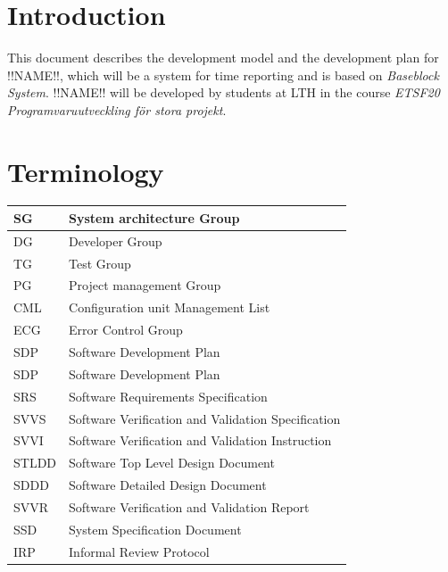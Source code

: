 \documentclass{article}
\date {#1}
\title {
    \documentNumber {01}    %
    \documentVersion {0.1}
    \documentTitle {Software Development Plan - SDP}
    \documentGroup {2}
    \documentResponsible {(PG) Project Management Group}
    \documentAuthors {(PG) Project Management Group}
    \documentDate {2021-02-01}
}
\begin{document}
\maketitle
\thispagestyle{empty}

\newpage

\tableofcontents

\newpage

\section{Introduction}
    This document describes the development model and the development plan for !!NAME!!, 
    which will be a system for time reporting and is based on \textit{Baseblock System}.
    !!NAME!! will be developed by students at LTH in the course 
    \textit{ETSF20 Programvaruutveckling för stora projekt}.

\section{Terminology}
    \renewcommand{\arraystretch}{1.7}  %
    
    \begin{table}[h]
        \centering
        \begin{tabular}{| l | l |}
            \hline
                SG & System architecture Group \\
            \hline
                DG & Developer Group \\
            \hline
                TG & Test Group \\
            \hline
                PG & Project management Group \\
            \hline 
                CML & Configuration unit Management List \\
            \hline            
                ECG & Error Control Group \\
            \hline
                SDP & Software Development Plan \\
            \hline
                SDP & Software Development Plan \\
            \hline
                SRS & Software Requirements Specification \\
            \hline
                SVVS & Software Verification and Validation Specification \\
            \hline
                SVVI & Software Verification and Validation Instruction \\
            \hline
                STLDD & Software Top Level Design Document \\
            \hline
                SDDD & Software Detailed Design Document \\
            \hline
                SVVR & Software Verification and Validation Report \\
            \hline
                SSD & System Specification Document \\
            \hline
                IRP & Informal Review Protocol \\
            \hline
        \end{tabular}
    \end{table}
\end{document}
